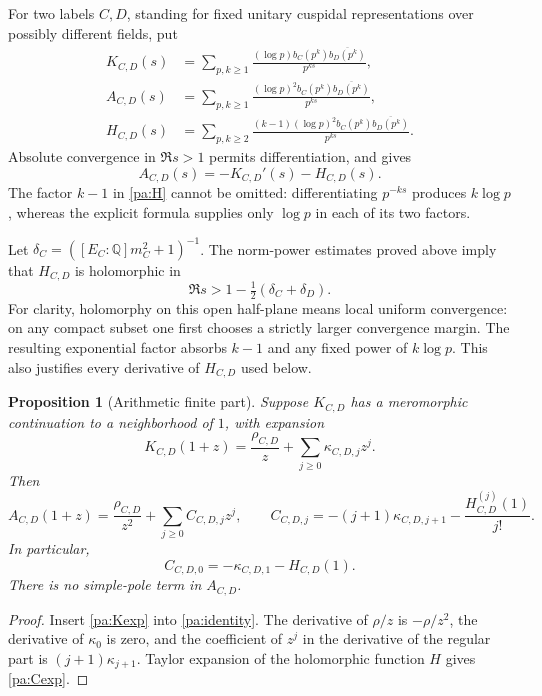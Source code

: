 \documentclass[11pt,reqno]{amsart}
\numberwithin{equation}{section}
\newtheorem{proposition}[theorem]{Proposition}
\theoremstyle{definition}
\theoremstyle{remark}
\begin{document}
For two labels $C,D$, standing for fixed unitary cuspidal representations over possibly different fields, put
\begin{align}
 K_{C,D}(s)&=\sum_{p,k\ge1}\frac{(\log p)b_C(p^k)\overline{b_D(p^k)}}{p^{ks}},\label{pa:K}\\
 A_{C,D}(s)&=\sum_{p,k\ge1}\frac{(\log p)^2b_C(p^k)\overline{b_D(p^k)}}{p^{ks}},\label{pa:A}\\
 H_{C,D}(s)&=\sum_{p,k\ge2}\frac{(k-1)(\log p)^2b_C(p^k)\overline{b_D(p^k)}}{p^{ks}}.\label{pa:H}
\end{align}
Absolute convergence in $\Re s>1$ permits differentiation, and gives
\begin{equation} A_{C,D}(s)=-K_{C,D}'(s)-H_{C,D}(s).\label{pa:identity}\end{equation}
The factor $k-1$ in \eqref{pa:H} cannot be omitted: differentiating $p^{-ks}$ produces $k\log p$, whereas the explicit formula supplies only $\log p$ in each of its two factors.

Let $\delta_C=([E_C:\mathbb Q]m_C^2+1)^{-1}$. The norm-power estimates proved above imply that $H_{C,D}$ is holomorphic in
\begin{equation}\Re s>1-\tfrac12(\delta_C+\delta_D).\label{pa:Hstrip}\end{equation}
For clarity, holomorphy on this open half-plane means local uniform convergence: on any compact subset one first chooses a strictly larger convergence margin. The resulting exponential factor absorbs $k-1$ and any fixed power of $k\log p$. This also justifies every derivative of $H_{C,D}$ used below.

\begin{proposition}[Arithmetic finite part]\label{pa:finite}
Suppose $K_{C,D}$ has a meromorphic continuation to a neighborhood of $1$, with expansion
\begin{equation}K_{C,D}(1+z)=\frac{\rho_{C,D}}z+\sum_{j\ge0}\kappa_{C,D,j}z^j.\label{pa:Kexp}\end{equation}
Then
\begin{equation}A_{C,D}(1+z)=\frac{\rho_{C,D}}{z^2}+\sum_{j\ge0}C_{C,D,j}z^j,\qquad
C_{C,D,j}=-(j+1)\kappa_{C,D,j+1}-\frac{H_{C,D}^{(j)}(1)}{j!}.\label{pa:Cexp}\end{equation}
In particular,
\begin{equation}C_{C,D,0}=-\kappa_{C,D,1}-H_{C,D}(1).\label{pa:C0}\end{equation}
There is no simple-pole term in $A_{C,D}$.
\end{proposition}
\begin{proof}
Insert \eqref{pa:Kexp} into \eqref{pa:identity}. The derivative of $\rho/z$ is $-\rho/z^2$, the derivative of $\kappa_0$ is zero, and the coefficient of $z^j$ in the derivative of the regular part is $(j+1)\kappa_{j+1}$. Taylor expansion of the holomorphic function $H$ gives \eqref{pa:Cexp}.
\end{proof}
\end{document}
